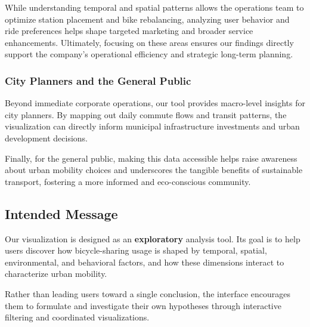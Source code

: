 While understanding temporal and spatial patterns allows the operations team to optimize station placement and bike rebalancing, analyzing user behavior and ride preferences helps shape targeted marketing and broader service enhancements. 
Ultimately, focusing on these areas ensures our findings directly support the company's operational efficiency and strategic long-term planning.

\subsubsection{City Planners and the General Public}
Beyond immediate corporate operations, our tool provides macro-level insights for city planners.
By mapping out daily commute flows and transit patterns, the visualization can directly inform municipal infrastructure investments and urban development decisions. 

Finally, for the general public, making this data accessible helps raise awareness about urban mobility choices and underscores the tangible benefits of sustainable transport, fostering a more informed and eco-conscious community.

\subsection{Intended Message}
Our visualization is designed as an \textbf{exploratory} analysis tool.
Its goal is to help users discover how bicycle-sharing usage is shaped by temporal, spatial, environmental, and behavioral factors, and how these dimensions interact to characterize urban mobility.

Rather than leading users toward a single conclusion, the interface encourages them to formulate and investigate their own hypotheses through interactive filtering and coordinated visualizations.
